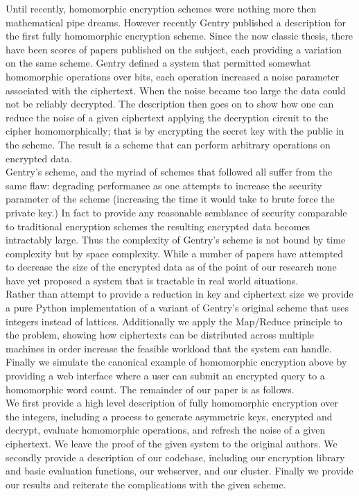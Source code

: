 \documentclass[letterpaper,11pt]{article} %
\begin{document}
	Until recently, homomorphic encryption schemes were nothing more then mathematical pipe dreams. However recently Gentry published a description for the first fully homomorphic encryption scheme. Since the now classic thesis, there have been scores of papers published on the subject, each providing a variation on the same scheme. Gentry defined a system that permitted somewhat homomorphic operations over bits, each operation increased a noise parameter associated with the ciphertext. When the noise became too large the data could not be reliably decrypted. The description then goes on to show how one can reduce the noise of a given ciphertext applying the decryption circuit to the cipher homomorphically; that is by encrypting the secret key with the public in the scheme. The result is a scheme that can perform arbitrary operations on encrypted data.\\

	Gentry's scheme, and the myriad of schemes that followed all suffer from the same flaw: degrading performance as one attempts to increase the security parameter of the scheme (increasing the time it would take to brute force the private key.) In fact to provide any reasonable semblance of security comparable to traditional encryption schemes the resulting encrypted data becomes intractably large. Thus the complexity of Gentry's scheme is not bound by time complexity but by space complexity. While a number of papers have attempted to decrease the size of the encrypted data as of the point of our research none have yet proposed a system that is tractable in real world situations.\\

	Rather than attempt to provide a reduction in key and ciphertext size we provide a pure Python implementation of a variant of Gentry's original scheme that uses integers instead of lattices. Additionally we apply the Map/Reduce principle to the problem, showing how ciphertexts can be distributed across multiple machines in order increase the feasible workload that the system can handle. Finally we simulate the canonical example of homomorphic encryption above by providing a web interface where a user can submit an encrypted query to a homomorphic word count. The remainder of our paper is as follows.\\

	We first provide a high level description of fully homomorphic encryption over the integers, including a process to generate asymmetric keys, encrypted and decrypt, evaluate homomorphic operations, and refresh the noise of a given ciphertext. We leave the proof of the given system to the original authors. We secondly provide a description of our codebase, including our encryption library and basic evaluation functions, our webserver, and our cluster. Finally we provide our results and reiterate the complications with the given scheme.
\end{document}
